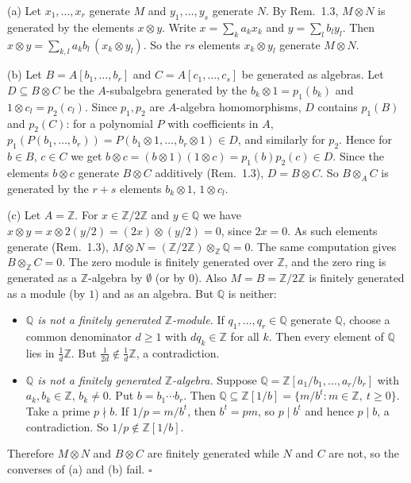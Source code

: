 \documentclass[11pt]{article}
\begin{document}
(a) Let $x_1,\dots,x_r$ generate $M$ and $y_1,\dots,y_s$ generate $N$. By Rem.~1.3, $M\otimes N$ is generated by the elements $x\otimes y$. Write $x=\sum_k a_kx_k$ and $y=\sum_l b_ly_l$. Then $x\otimes y=\sum_{k,l}a_kb_l\,(x_k\otimes y_l)$. So the $rs$ elements $x_k\otimes y_l$ generate $M\otimes N$.

(b) Let $B=A[b_1,\dots,b_r]$ and $C=A[c_1,\dots,c_s]$ be generated as algebras. Let $D\subseteq B\otimes C$ be the $A$-subalgebra generated by the $b_k\otimes1=p_1(b_k)$ and $1\otimes c_l=p_2(c_l)$. Since $p_1,p_2$ are $A$-algebra homomorphisms, $D$ contains $p_1(B)$ and $p_2(C)$: for a polynomial $P$ with coefficients in $A$, $p_1(P(b_1,\dots,b_r))=P(b_1\otimes1,\dots,b_r\otimes1)\in D$, and similarly for $p_2$. Hence for $b\in B$, $c\in C$ we get $b\otimes c=(b\otimes1)(1\otimes c)=p_1(b)p_2(c)\in D$. Since the elements $b\otimes c$ generate $B\otimes C$ additively (Rem.~1.3), $D=B\otimes C$. So $B\otimes_A C$ is generated by the $r+s$ elements $b_k\otimes 1$, $1\otimes c_l$.

(c) Let $A=\mathbb Z$. For $x\in\mathbb Z/2\mathbb Z$ and $y\in\mathbb Q$ we have $x\otimes y=x\otimes 2(y/2)=(2x)\otimes(y/2)=0$, since $2x=0$. As such elements generate (Rem.~1.3), $M\otimes N=(\mathbb Z/2\mathbb Z)\otimes_{\mathbb Z}\mathbb Q=0$. The same computation gives $B\otimes_{\mathbb Z}C=0$. The zero module is finitely generated over $\mathbb Z$, and the zero ring is generated as a $\mathbb Z$-algebra by $\emptyset$ (or by $0$). Also $M=B=\mathbb Z/2\mathbb Z$ is finitely generated as a module (by $1$) and as an algebra. But $\mathbb Q$ is neither:
\begin{itemize}
\item \emph{$\mathbb Q$ is not a finitely generated $\mathbb Z$-module.} If $q_1,\dots,q_r\in\mathbb Q$ generate $\mathbb Q$, choose a common denominator $d\ge1$ with $dq_k\in\mathbb Z$ for all $k$. Then every element of $\mathbb Q$ lies in $\frac1d\mathbb Z$. But $\frac1{2d}\notin\frac1d\mathbb Z$, a contradiction.
\item \emph{$\mathbb Q$ is not a finitely generated $\mathbb Z$-algebra.} Suppose $\mathbb Q=\mathbb Z[a_1/b_1,\dots,a_r/b_r]$ with $a_k,b_k\in\mathbb Z$, $b_k\neq0$. Put $b=b_1\cdots b_r$. Then $\mathbb Q\subseteq\mathbb Z[1/b]=\{m/b^t:m\in\mathbb Z,\ t\ge0\}$. Take a prime $p\nmid b$. If $1/p=m/b^t$, then $b^t=pm$, so $p\mid b^t$ and hence $p\mid b$, a contradiction. So $1/p\notin\mathbb Z[1/b]$.
\end{itemize}
Therefore $M\otimes N$ and $B\otimes C$ are finitely generated while $N$ and $C$ are not, so the converses of (a) and (b) fail. \hfill$\square$
\end{document}

